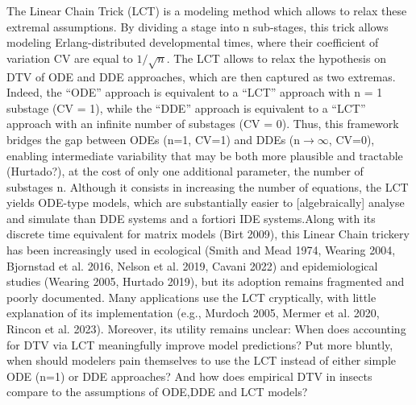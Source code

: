 \documentclass[12pt,a4paper,onecolumn]{article}
\begin{document}
\tabto{1 cm}  The Linear Chain Trick (LCT) is a modeling method which allows to relax these extremal assumptions. By dividing a stage into n sub-stages, this trick allows modeling Erlang-distributed developmental times, where their coefficient of variation CV are equal to $1/\sqrt{n}$. The LCT allows to relax the hypothesis on DTV of ODE and DDE approaches, which are then captured as two extremas. Indeed, the “ODE” approach is equivalent to a “LCT” approach with n = 1 substage (CV = 1), while the “DDE” approach is equivalent to a “LCT” approach with an infinite number of substages (CV = 0). Thus, this framework bridges the gap between ODEs (n=1, CV=1) and DDEs (n$\rightarrow \infty$, CV=0), enabling intermediate variability that may be both more plausible and tractable (Hurtado?), at the cost of only one additional parameter, the number of substages n. Although it consists in increasing the number of equations, the LCT yields ODE-type models, which are substantially easier to [algebraically] analyse and simulate than DDE systems and a fortiori IDE systems.Along with its discrete time equivalent for matrix models (Birt 2009), this Linear Chain trickery has been increasingly used in ecological (Smith and Mead 1974, Wearing 2004, Bjornstad et al. 2016, Nelson et al. 2019, Cavani 2022) and epidemiological studies (Wearing 2005, Hurtado 2019), but its adoption remains fragmented and poorly documented. Many applications use the LCT cryptically, with little explanation of its implementation (e.g., Murdoch 2005, Mermer et al. 2020, Rincon et al. 2023). Moreover, its utility remains unclear: When does accounting for DTV via LCT meaningfully improve model predictions? Put more bluntly, when should modelers pain themselves to use the LCT instead of either simple ODE (n=1) or DDE approaches? And how does empirical DTV in insects compare to the assumptions of ODE,DDE and LCT models? \\
\end{document}
